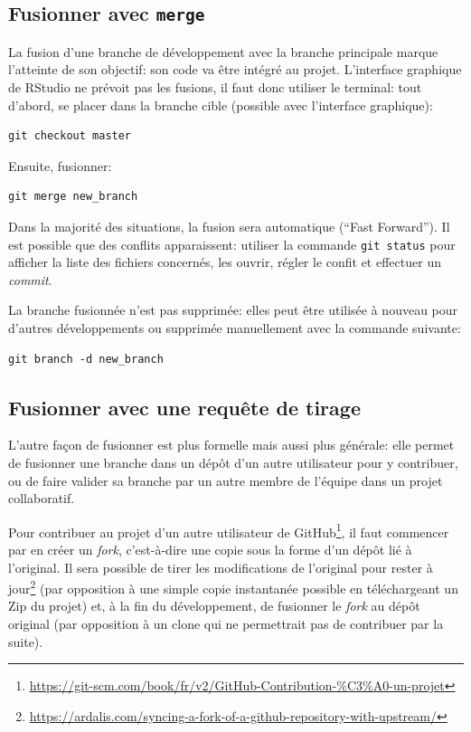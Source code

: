 \documentclass[
  12pt,
  french,
  a4paper,
  extrafontsizes,onecolumn,openright
  ]{memoir}
\newlength{\rf}
\begin{document}
\hypertarget{fusionner-avec-merge}{%
\subsection{\texorpdfstring{Fusionner avec \texttt{merge}}{Fusionner avec merge}}\label{fusionner-avec-merge}}

La fusion d'une branche de développement avec la branche principale marque l'atteinte de son objectif: son code va être intégré au projet.
L'interface graphique de RStudio ne prévoit pas les fusions, il faut donc utiliser le terminal: tout d'abord, se placer dans la branche cible (possible avec l'interface graphique):

\begin{verbatim}
git checkout master
\end{verbatim}

Ensuite, fusionner:

\begin{verbatim}
git merge new_branch
\end{verbatim}

Dans la majorité des situations, la fusion sera automatique (\enquote{Fast Forward}).
Il est possible que des conflits apparaissent: utiliser la commande \texttt{git\ status} pour afficher la liste des fichiers concernés, les ouvrir, régler le confit et effectuer un \emph{commit}.

La branche fusionnée n'est pas supprimée: elles peut être utilisée à nouveau pour d'autres développements ou supprimée manuellement avec la commande suivante:

\begin{verbatim}
git branch -d new_branch
\end{verbatim}

\hypertarget{fusionner-avec-une-requuxeate-de-tirage}{%
\subsection{Fusionner avec une requête de tirage}\label{fusionner-avec-une-requuxeate-de-tirage}}

L'autre façon de fusionner est plus formelle mais aussi plus générale: elle permet de fusionner une branche dans un dépôt d'un autre utilisateur pour y contribuer, ou de faire valider sa branche par un autre membre de l'équipe dans un projet collaboratif.

Pour contribuer au projet d'un autre utilisateur de GitHub\footnote{\url{https://git-scm.com/book/fr/v2/GitHub-Contribution-\%C3\%A0-un-projet}}, il faut commencer par en créer un \emph{fork}, c'est-à-dire une copie sous la forme d'un dépôt lié à l'original.
Il sera possible de tirer les modifications de l'original pour rester à jour\footnote{\url{https://ardalis.com/syncing-a-fork-of-a-github-repository-with-upstream/}} (par opposition à une simple copie instantanée possible en téléchargeant un Zip du projet) et, à la fin du développement, de fusionner le \emph{fork} au dépôt original (par opposition à un clone qui ne permettrait pas de contribuer par la suite).
\end{document}
